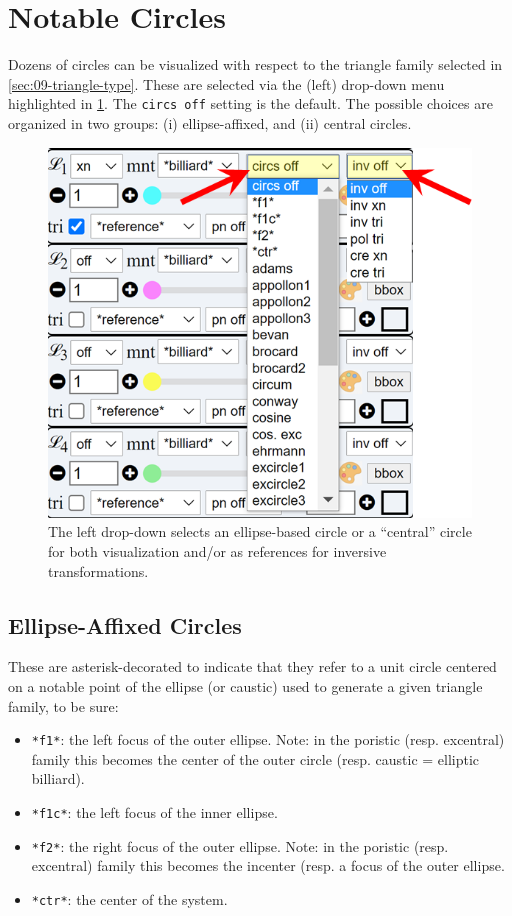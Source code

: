 \section{Notable Circles}
\label{sec:09-inversion-circles}

Dozens of circles can be visualized with respect to the triangle family selected in \cref{sec:09-triangle-type}. These are selected via the (left) drop-down menu highlighted in \cref{fig:09-menu-circles}. The \texttt{circs off} setting is the default. The possible choices are organized in two groups: (i) ellipse-affixed, and (ii) central circles.

\begin{figure}
    \centering
    \includegraphics[width=.6\textwidth]{chap_09/pics/pics_09_100_circles_inv.png}
    \caption{The left drop-down selects an ellipse-based circle or a ``central'' circle for both visualization and/or as references for inversive transformations.}
    \label{fig:09-menu-circles}
\end{figure}

\subsection{Ellipse-Affixed Circles}

These are asterisk-decorated to indicate that they refer to a unit circle centered on a notable point of the ellipse (or caustic) used to generate a given triangle family, to be sure:

\begin{itemize}
\item \texttt{*f1*}: the left focus of the outer ellipse. Note: in the poristic (resp. excentral) family this becomes the center of the outer circle (resp. caustic = elliptic billiard).
\item \texttt{*f1c*}: the left focus of the inner ellipse. 
\item \texttt{*f2*}: the right focus of the outer ellipse. Note: in the poristic (resp. excentral) family this becomes the incenter (resp. a focus of the outer ellipse.
\item \texttt{*ctr*}: the center of the system.
\end{itemize}

